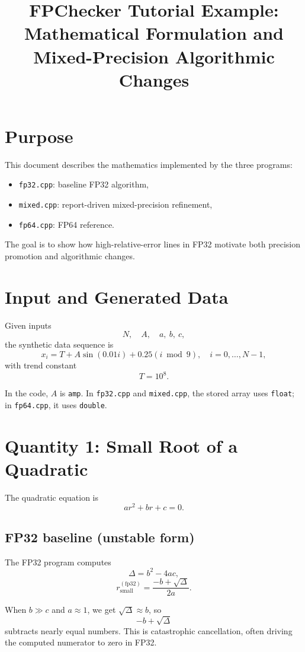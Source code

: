 \documentclass[11pt]{article}
\title{FPChecker Tutorial Example: Mathematical Formulation and Mixed-Precision Algorithmic Changes}
\author{}
\date{}
\begin{document}
\maketitle

\section{Purpose}
This document describes the mathematics implemented by the three programs:
\begin{itemize}
  \item \texttt{fp32.cpp}: baseline FP32 algorithm,
  \item \texttt{mixed.cpp}: report-driven mixed-precision refinement,
  \item \texttt{fp64.cpp}: FP64 reference.
\end{itemize}

The goal is to show how high-relative-error lines in FP32 motivate both precision promotion and algorithmic changes.

\section{Input and Generated Data}
Given inputs
\[
N,\quad A,\quad a,\ b,\ c,
\]
the synthetic data sequence is
\[
x_i = T + A\sin(0.01 i) + 0.25(i \bmod 9), \quad i=0,\dots,N-1,
\]
with trend constant
\[
T = 10^8.
\]

In the code, \(A\) is \texttt{amp}. In \texttt{fp32.cpp} and \texttt{mixed.cpp}, the stored array uses \texttt{float}; in \texttt{fp64.cpp}, it uses \texttt{double}.

\section{Quantity 1: Small Root of a Quadratic}
The quadratic equation is
\[
a r^2 + b r + c = 0.
\]

\subsection{FP32 baseline (unstable form)}
The FP32 program computes
\[
\Delta = b^2 - 4ac,
\]
\[
r_{\text{small}}^{(\mathrm{fp32})} = \frac{-b + \sqrt{\Delta}}{2a}.
\]

When \(b \gg c\) and \(a\approx 1\), we get \(\sqrt{\Delta} \approx b\), so
\[
-b + \sqrt{\Delta}
\]
subtracts nearly equal numbers. This is catastrophic cancellation, often driving the computed numerator to zero in FP32.
\end{document}

